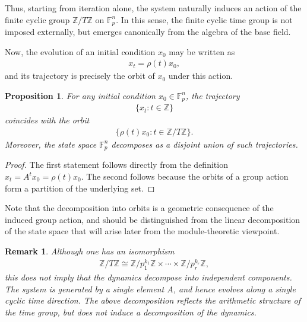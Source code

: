 \documentclass[letterpaper, 9pt, conference]{ieeeconf}
\newtheorem{proposition}[theorem]{Proposition}
\newtheorem{remark}[theorem]{Remark}
\begin{document}
Thus, starting from iteration alone, the system naturally induces an action of
the finite cyclic group $\mathbb{Z}/T\mathbb{Z}$ on $\mathbb{F}_p^n$. In this sense, the finite cyclic time group is not imposed externally, but emerges canonically from the algebra of the base field. 

Now, the evolution of an initial condition $x_0$ may be written as
\begin{eqnarray}
x_t = \rho(t)x_0,
\end{eqnarray}
and its trajectory is precisely the orbit of $x_0$ under this action.

\begin{proposition}
For any initial condition $x_0 \in \mathbb{F}_p^n$, the trajectory
\begin{eqnarray}
\{x_t : t \in \mathbb{Z}\}
\end{eqnarray}
coincides with the orbit
\begin{eqnarray}
\{\rho(t)x_0 : t \in \mathbb{Z}/T\mathbb{Z}\}.
\end{eqnarray}
Moreover, the state space $\mathbb{F}_p^n$ decomposes as a disjoint union of
such trajectories.
\end{proposition}

\begin{proof}
The first statement follows directly from the definition
$x_t=A^t x_0=\rho(t)x_0$. The second follows because the orbits of a group
action form a partition of the underlying set.
\end{proof}

Note that the decomposition into orbits is a geometric consequence of the
induced group action, and should be distinguished from the linear decomposition
of the state space that will arise later from the module-theoretic viewpoint.

\begin{remark}
Although one has an isomorphism
\begin{eqnarray}
\mathbb{Z}/T\mathbb{Z} \cong \mathbb{Z}/p_1^{k_1}\mathbb{Z} \times \cdots \times \mathbb{Z}/p_r^{k_r}\mathbb{Z},
\end{eqnarray}
this does not imply that the dynamics decompose into independent components.
The system is generated by a single element $A$, and hence evolves along a
single cyclic time direction. The above decomposition reflects the arithmetic
structure of the time group, but does not induce a decomposition of the
dynamics.
\end{remark}
\end{document}
